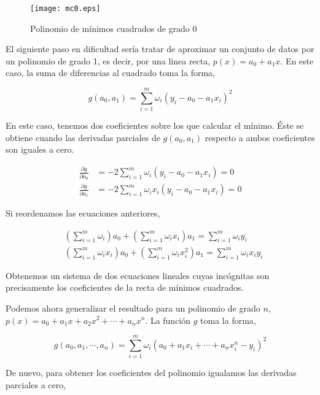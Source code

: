 \begin{figure}[h]
\centering
\texttt{[image: mc0.eps]}
\caption{Polinomio de mínimos cuadrados de grado 0} 
\label{fig:mc0}
\end{figure} 
\begin{paracol}{2}
El siguiente paso en dificultad sería tratar de aproximar un conjunto de datos por un polinomio de grado 1, es decir, por una linea recta, $p(x)=a_0+a_1 x$. En este caso, la suma de diferencias al cuadrado toma la forma,
\end{paracol}
\begin{equation*}
g(a_0,a_1)=\sum_{i=1}^m \omega_i\left(y_i-a_0-a_1 x_i \right)^2
\end{equation*}
\begin{paracol}{2} 
En este caso, tenemos dos coeficientes sobre los que calcular el mínimo. Éste se obtiene cuando las derivadas parciales de $g(a_0,a_1)$ respecto a ambos coeficientes son iguales a cero. 
\end{paracol}
\begin{align*}
\frac{\partial g}{\partial a_0}&=-2\sum_{i=1}^m \omega_i (y_i-a_0-a_1 x_i) = 0\\
\frac{\partial g}{\partial a_1}&=-2\sum_{i=1}^m \omega_i x_i(y_i-a_0-a_1 x_i) = 0
\end{align*} 
\begin{paracol}{2}
Si reordenamos las ecuaciones anteriores, 
\end{paracol}
\begin{align*}
&\left(\sum_{i=1}^m \omega_i\right)a_0+ \left(\sum_{i=1}^m \omega_ix_i\right)a_1 =\sum_{i=1}^m \omega_iy_i\\
&\left(\sum_{i=1}^m \omega_ix_i\right)a_0+ \left(\sum_{i=1}^m \omega_ix_i^2\right)a_1 =\sum_{i=1}^m \omega_ix_iy_i
\end{align*}
\begin{paracol}{2}
Obtenemos un sistema de dos ecuaciones lineales cuyas incógnitas son precisamente los coeficientes de la recta de mínimos cuadrados.

Podemos ahora generalizar el resultado para un polinomio de grado $n$, $p(x)=a_0+a_1x+a_2x^2+\cdots +a_nx^n$. La función $g$ toma la forma,
\end{paracol}
\begin{equation*}
g(a_0,a_1,\cdots, a_n)=\sum_{i=1}^m \omega_i \left (a_0+a_1x_i+\cdots+ a_nx_i^n-y_i\right)^2
\end{equation*}
\begin{paracol}{2}
De nuevo, para obtener los coeficientes del polinomio igualamos las derivadas parciales a cero,
\end{paracol}
